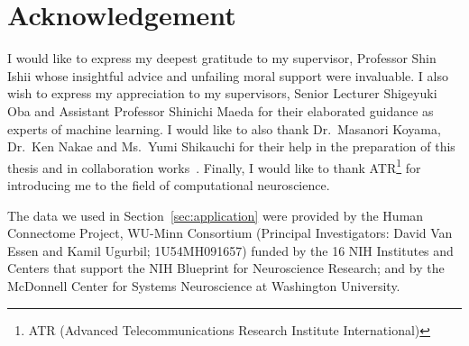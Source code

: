 \section{Acknowledgement}
%
I would like to express my deepest gratitude to my supervisor, Professor Shin Ishii whose
insightful advice and unfailing moral support were invaluable.
I also wish to express my appreciation to my supervisors,
Senior Lecturer Shigeyuki Oba and Assistant Professor Shinichi Maeda
for their elaborated guidance as experts of machine learning.
I would like to also thank Dr.\ Masanori Koyama, Dr.\ Ken Nakae and Ms.\ Yumi Shikauchi for their help in the preparation of this thesis and in collaboration works~\cite{Koyamada2014a,Koyamada2014b,Koyamada2015}.
Finally, I would like to thank ATR\footnote{ATR (Advanced
Telecommunications Research Institute International)}
for introducing me to the field of computational neuroscience.

The data we used in Section~\ref{sec:application} were provided by the Human Connectome Project,
WU-Minn Consortium
(Principal Investigators: David Van Essen and Kamil Ugurbil;
1U54MH091657) funded by the 16 NIH Institutes and Centers that support
the NIH Blueprint for Neuroscience Research; and by the McDonnell Center
for Systems Neuroscience at Washington University.
